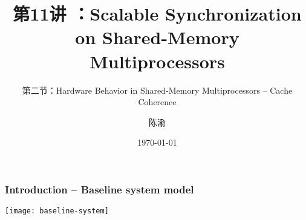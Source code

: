 


\title[第11讲]{第11讲 ：Scalable Synchronization on Shared-Memory Multiprocessors} %
\subtitle{第二节：Hardware Behavior in Shared-Memory Multiprocessors -- Cache Coherence}
\author{陈渝} %
\date{\today} %




\begin{frame}
\titlepage %
\end{frame}

%
%
\begin{frame}[plain]
	\frametitle{Introduction -- Baseline system model}


			\centering
			
			\texttt{[image: baseline-system]}

	
\end{frame}

